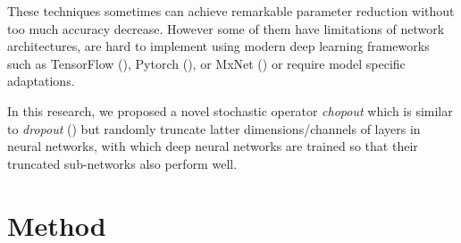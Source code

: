 \documentclass{article}
\begin{document}
    These techniques sometimes can achieve remarkable parameter reduction without too much accuracy decrease. However some of them have limitations of network architectures, are hard to implement using modern deep learning frameworks such as TensorFlow (\citet{abadi2016tensorflow}), Pytorch (\citet{paszke2017automatic}), or MxNet (\citet{chen2015mxnet}) or require model specific adaptations.

    In this research, we proposed a novel stochastic operator \textit{chopout} which is similar to \textit{dropout} (\citet{srivastava2014dropout}) but randomly truncate latter dimensions/channels of layers in neural networks, with which deep neural networks are trained so that their truncated sub-networks also perform well. 

    
    \section{Method}
    \label{sec:method}
    
\end{document}
